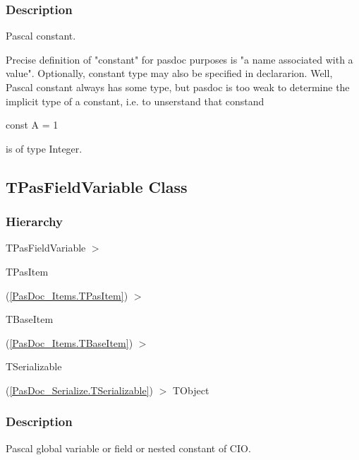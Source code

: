 \documentclass{report}
\newif\ifpdf
\begin{document}
\subsubsection*{\large{\textbf{Description}}\normalsize\hspace{1ex}\hfill}
Pascal constant.\hfill\vspace*{1ex}



Precise definition of "constant" for pasdoc purposes is "a name associated with a value". Optionally, constant type may also be specified in declararion. Well, Pascal constant always has some type, but pasdoc is too weak to determine the implicit type of a constant, i.e. to unserstand that constand \begin{ttfamily}const A = 1\end{ttfamily} is of type Integer.\ifpdf
\subsection*{\large{\textbf{TPasFieldVariable Class}}\normalsize\hspace{1ex}\hrulefill}
\else
\subsection*{TPasFieldVariable Class}
\fi
\label{PasDoc_Items.TPasFieldVariable}
\subsubsection*{\large{\textbf{Hierarchy}}\normalsize\hspace{1ex}\hfill}
TPasFieldVariable {$>$} \begin{ttfamily}TPasItem\end{ttfamily}(\ref{PasDoc_Items.TPasItem}) {$>$} \begin{ttfamily}TBaseItem\end{ttfamily}(\ref{PasDoc_Items.TBaseItem}) {$>$} \begin{ttfamily}TSerializable\end{ttfamily}(\ref{PasDoc_Serialize.TSerializable}) {$>$} 
TObject
\subsubsection*{\large{\textbf{Description}}\normalsize\hspace{1ex}\hfill}
Pascal global variable or field or nested constant of CIO.\hfill\vspace*{1ex}
\end{document}

